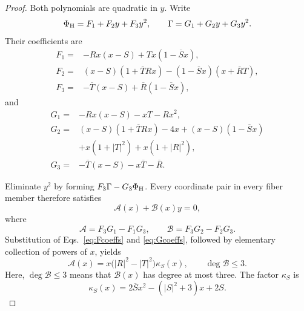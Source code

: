 \documentclass[aps,prx,reprint,nofootinbib,twoside,superscriptaddress,longbibliography,floatfix]{revtex4-2}
\theoremstyle{definition}
\begin{document}
\begin{proof}
Both polynomials are quadratic in $y$.  Write
\begin{equation}
\Phi_{\rm H}=F_1+F_2y+F_3y^2,
\qquad
\Gamma=G_1+G_2y+G_3y^2.
\label{eq:FGcoeffdefinition}
\end{equation}
Their coefficients are
\begin{equation}
\begin{aligned}
F_1={}&-Rx(x-S)+Tx(1-\overline Sx),\\
F_2={}&(x-S)(1+\overline T Rx)
       -(1-\overline Sx)(x+\overline RT),\\
F_3={}&-\overline T(x-S)+\overline R(1-\overline Sx),
\end{aligned}
\label{eq:Fcoeffs}
\end{equation}
and
\begin{equation}
\begin{aligned}
G_1={}&-Rx(x-S)-xT-Rx^2,\\
G_2={}&(x-S)(1+\overline T Rx)-4x
 +(x-S)(1-\overline Sx)\\
&+x(1+|T|^2)+x(1+|R|^2),\\
G_3={}&-\overline T(x-S)-x\overline T-\overline R.
\end{aligned}
\label{eq:Gcoeffs}
\end{equation}

Eliminate $y^2$ by forming $F_3\Gamma-G_3\Phi_{\rm H}$.  Every coordinate pair in every fiber member therefore satisfies
\begin{equation}
\mathcal A(x)+\mathcal B(x)y=0,
\label{eq:linearEliminant}
\end{equation}
where
\begin{equation}
\mathcal A=F_3G_1-F_1G_3,
\qquad
\mathcal B=F_3G_2-F_2G_3.
\label{eq:ABeliminants}
\end{equation}
Substitution of Eqs.~\eqref{eq:Fcoeffs} and \eqref{eq:Gcoeffs}, followed by elementary collection of powers of $x$, yields
\begin{equation}
\mathcal A(x)=x\bigl(|R|^2-|T|^2\bigr)\kappa_S(x),
\qquad \deg\mathcal B\leq3.
\label{eq:Afactor}
\end{equation}
Here, $\deg\mathcal B\leq3$ means that $\mathcal B(x)$ has degree at most three. The factor $\kappa_S$ is
\begin{equation}
\kappa_S(x)=2\overline Sx^2-(|S|^2+3)x+2S.
\label{eq:kappaS}
\end{equation}


\end{proof}
\end{document}
